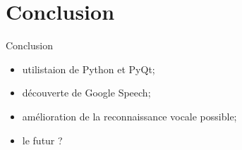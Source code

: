 \documentclass{beamer}
\begin{document}
	\section{Conclusion}
	
\begin{frame}{Conclusion}

	\begin{itemize}
		\item utilistaion de Python et PyQt;
		\item découverte de Google Speech;
		\item amélioration de la reconnaissance vocale possible;
		\item le futur ?
	\end{itemize}	
	
\end{frame}




	
\end{document}
